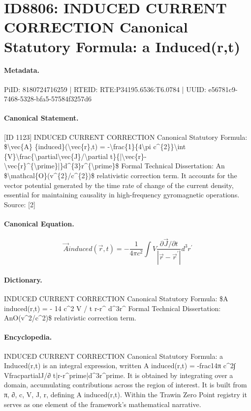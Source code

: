 \section*{ID8806: INDUCED CURRENT CORRECTION Canonical Statutory Formula: a Induced(r,t)}
\paragraph{Metadata.}
PiID: 8180724716259 | RTEID: RTE:P34195.6536:T6.0784 | UUID: e56781c9-7468-5328-bfa5-57584f3257d6

\paragraph{Canonical Statement.}
[ID 1123] INDUCED CURRENT CORRECTION Canonical Statutory Formula: \$\textbackslash{}vec\{A\} \{induced\}(\textbackslash{}vec\{r\},t) = -\textbackslash{}frac\{1\}\{4\textbackslash{}pi c\textasciicircum{}\{2\}\}\textbackslash{}int \{V\}\textbackslash{}frac\{\textbackslash{}partial\textbackslash{}vec\{J\}/\textbackslash{}partial t\}\{|\textbackslash{}vec\{r\}-\textbackslash{}vec\{r\}\textasciicircum{}\{\textbackslash{}prime\}|\}d\textasciicircum{}\{3\}r\textasciicircum{}\{\textbackslash{}prime\}\$ Formal Technical Dissertation: An \$\textbackslash{}mathcal\{O\}(v\textasciicircum{}\{2\}/c\textasciicircum{}\{2\})\$ relativistic correction term. It accounts for the vector potential generated by the time rate of change of the current density, essential for maintaining causality in high-frequency gyromagnetic operations. Source: [2]

\paragraph{Canonical Equation.}
\[
\vec{A} {induced}(\vec{r},t) = -\frac{1}{4\pi c^{2}}\int {V}\frac{\partial\vec{J}/\partial t}{|\vec{r}-\vec{r}^{\prime}|}d^{3}r^{\prime}
\]

\paragraph{Dictionary.}
INDUCED CURRENT CORRECTION Canonical Statutory Formula: \$A induced(r,t) = - 14 c\textasciicircum{}2 V / t r-r\textasciicircum{} d\textasciicircum{}3r\textasciicircum{} Formal Technical Dissertation: AnO(v\textasciicircum{}2/c\textasciicircum{}2)\$ relativistic correction term.

\paragraph{Encyclopedia.}
INDUCED CURRENT CORRECTION Canonical Statutory Formula: a Induced(r,t) is an integral expression, written A induced(r,t) = -frac14π c\textasciicircum{}2∫ VfracpartialJ/∂ t|r-r\textasciicircum{}prime|d\textasciicircum{}3r\textasciicircum{}prime. It is obtained by integrating over a domain, accumulating contributions across the region of interest. It is built from π, ∂, c, V, J, r, defining A induced(r,t). Within the Trawin Zero Point registry it serves as one element of the framework's mathematical narrative.
